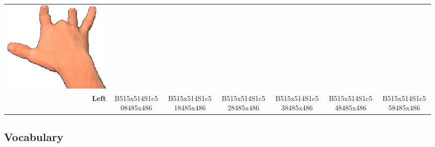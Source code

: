 \documentclass{article}
\begin{document}
\begin{center}
\begin{tabular}{r*{6}{c}}
\includegraphics[scale=0.1]{images/08-03-6.jpg}\\
\textbf{Left}&
B515x514S1c508485x486&
B515x514S1c518485x486&
B515x514S1c528485x486&
B515x514S1c538485x486&
B515x514S1c548485x486&
B515x514S1c558485x486\\
\end{tabular}
\end{center}

\subsection{Vocabulary}
\end{document}
